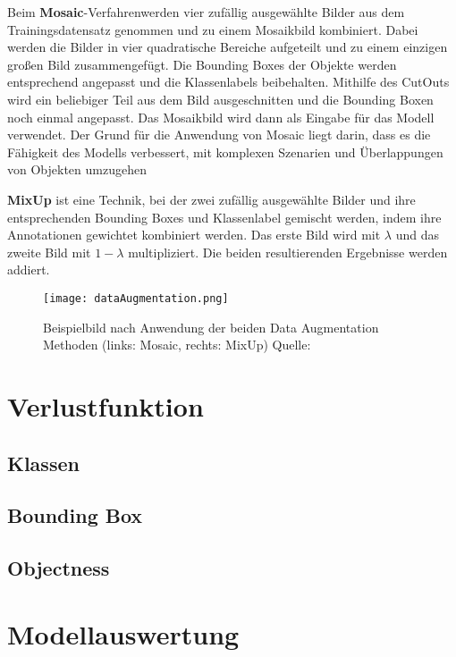 Beim \textbf{Mosaic}-Verfahrenwerden vier zufällig ausgewählte Bilder aus dem Trainingsdatensatz genommen und zu einem Mosaikbild kombiniert. Dabei werden die Bilder in vier quadratische Bereiche aufgeteilt und zu einem einzigen großen Bild zusammengefügt. Die Bounding Boxes der Objekte werden entsprechend angepasst und die Klassenlabels beibehalten. Mithilfe des CutOuts wird ein beliebiger Teil aus dem Bild ausgeschnitten und die Bounding Boxen noch einmal angepasst. Das Mosaikbild wird dann als Eingabe für das Modell verwendet. Der Grund für die Anwendung von Mosaic liegt darin, dass es die Fähigkeit des Modells verbessert, mit komplexen Szenarien und Überlappungen von Objekten umzugehen

\textbf{MixUp} ist eine Technik, bei der zwei zufällig ausgewählte Bilder und ihre entsprechenden Bounding Boxes und Klassenlabel gemischt werden, indem ihre Annotationen gewichtet kombiniert werden. Das erste Bild wird mit $\lambda$ und das zweite Bild mit $1-\lambda$ multipliziert. Die beiden resultierenden Ergebnisse werden addiert. \cite{yoloxExplanationAug}

\begin{figure}[h]
	\centering
	\texttt{[image: dataAugmentation.png]}
	\caption[Beispielbild nach Anwendung der beiden Data Augmentation Methoden]{Beispielbild nach Anwendung der beiden Data Augmentation Methoden (links: Mosaic, rechts: MixUp) Quelle: \cite{yoloxExplanationAug}}
	\label{fig:yoloxExplanationAug}
\end{figure}



\section{Verlustfunktion}
\subsection{Klassen}


\subsection{Bounding Box}


\subsection{Objectness}


\section{Modellauswertung}